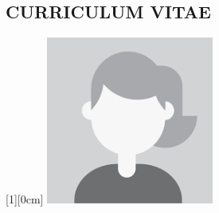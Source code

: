 
\clearpage
    \vspace*{\fill}
        \begin{center}
            \begin{minipage}{.6\textwidth}
                
\section {CURRICULUM VITAE}
                
            \end{minipage}
        \end{center}
    \vfill
\clearpage

\newpage

\begin{flushright}
	\raisebox{-5,1cm}[1][0cm]
	{\includegraphics[width=5.5cm]{image/pic.png}}
\end{flushright}



